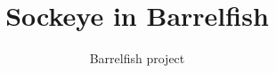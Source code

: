 \documentclass[a4paper,11pt,twoside]{report}
\title{Sockeye in Barrelfish}
\author{Barrelfish project}
\begin{document}
\maketitle      %

\begin{versionhistory}
\end{versionhistory}

\tableofcontents    %
\cleardoublepage
\setcounter{secnumdepth}{2}

\newcommand{\fnname}[1]{\textit{\texttt{#1}}}%
\newcommand{\datatype}[1]{\textit{\texttt{#1}}}%
\newcommand{\varname}[1]{\texttt{#1}}%
\newcommand{\keywname}[1]{\textbf{\texttt{#1}}}%
\newcommand{\pathname}[1]{\texttt{#1}}%
\newcommand{\tabindent}{\hspace*{3ex}}%
\end{document}
